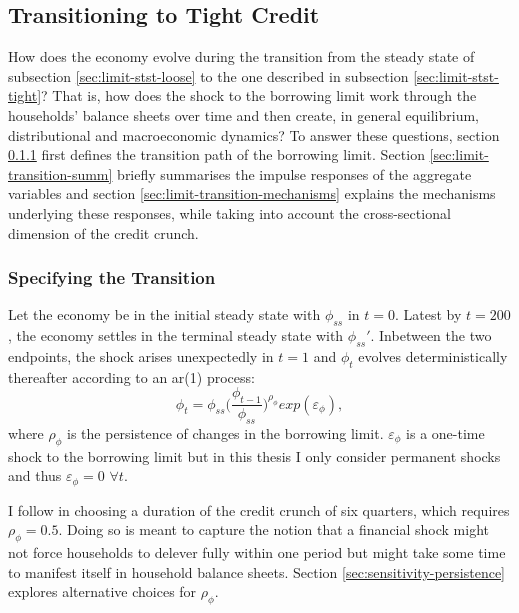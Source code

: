 \documentclass[a4paper,12pt]{article} %
\numberwithin{equation}{section} %
\numberwithin{figure}{section}
\numberwithin{table}{section}
\begin{document}
\subsection{Transitioning to Tight Credit}
\label{sec:limit-transition}

How does the economy evolve during the transition from the steady state of subsection \ref{sec:limit-stst-loose} to the one described in subsection \ref{sec:limit-stst-tight}? That is, how does the shock to the borrowing limit work through the households' balance sheets over time and then create, in general equilibrium, distributional and macroeconomic dynamics? To answer these questions, section \ref{sec:limit-transition-specific} first defines the transition path of the borrowing limit. Section \ref{sec:limit-transition-summ} briefly summarises the impulse responses of the aggregate variables and section \ref{sec:limit-transition-mechanisms} explains the mechanisms underlying these responses, while taking into account the cross-sectional dimension of the credit crunch. 

\subsubsection{Specifying the Transition}
\label{sec:limit-transition-specific}

Let the economy be in the initial steady state with $\phi_{ss}$ in $t=0$. Latest by $t=200$, the economy settles in the terminal steady state with $\phi_{ss}'$. Inbetween the two endpoints, the shock arises unexpectedly in $t=1$ and $\phi_t$ evolves deterministically thereafter according to an \Gls{ar}(1) process:
\begin{equation}
    \phi_t = \phi_{ss} \Bigg( \frac{\phi_{t-1}}{\phi_{ss}} \Bigg)^{\rho_{\phi}} exp(\varepsilon_{\phi}), \label{eq:borrowing-limit-process}
\end{equation}
where $\rho_{\phi}$ is the persistence of changes in the borrowing limit. $\varepsilon_{\phi}$ is a one-time shock to the borrowing limit but in this thesis I only consider permanent shocks and thus $\varepsilon_{\phi} = 0$ $\forall t$.

I follow \textcite{gl2017} in choosing a duration of the credit crunch of six quarters, which requires $\rho_{\phi} = 0.5$. Doing so is meant to capture the notion that a financial shock might not force households to delever fully within one period but might take some time to manifest itself in household balance sheets. Section \ref{sec:sensitivity-persistence} explores alternative choices for $\rho_{\phi}$.
\end{document}
